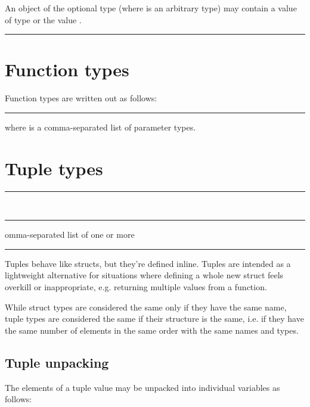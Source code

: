An object of the optional type  (where  is an arbitrary type)
may contain a value of type  or the value .

\begin{grammar}
\rule{optional-type}  
\end{grammar}

\section{Function types}

Function types are written out as follows:

\begin{grammar}
\rule{function-type} \code{(}  \code{)} \code{->} 
\end{grammar}

where  is a comma-separated list of parameter
types.

\section{Tuple types}

\begin{grammar}
\rule{tuple-type} \code{(}  \code{)}\\
\rule{tuple-element-list} comma-separated list of one or more \\
\rule{tuple-element}  \code{:} 
\end{grammar}

Tuples behave like structs, but they're defined inline. Tuples are intended as
a lightweight alternative for situations where defining a whole new struct feels
overkill or inappropriate, e.g. returning multiple values from a function.

While struct types are considered the same only if they have the same name,
tuple types are considered the same if their structure is the same, i.e. if they
have the same number of elements in the same order with the same names and
types.

\subsection{Tuple unpacking}

The elements of a tuple value may be unpacked into individual variables as
follows:

